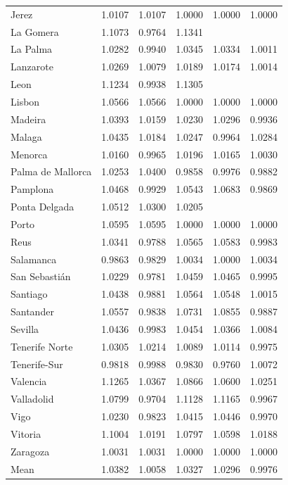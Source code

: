 \begin{table}[h!]
{\begin{tabular}{lccccc}
Jerez & 1.0107 & 1.0107 & 1.0000 & 1.0000 & 1.0000 \\
La Gomera &1.1073& 0.9764& 1.1341 &  &  \\ 
La Palma & 1.0282 & 0.9940 & 1.0345 & 1.0334 & 1.0011 \\
Lanzarote & 1.0269 & 1.0079 & 1.0189 & 1.0174 & 1.0014 \\
Leon & 1.1234 & 0.9938 & 1.1305 &  &  \\
Lisbon & 1.0566 & 1.0566 & 1.0000 & 1.0000 & 1.0000 \\
Madeira & 1.0393 & 1.0159 & 1.0230 & 1.0296 & 0.9936 \\
Malaga & 1.0435 & 1.0184 & 1.0247 & 0.9964 & 1.0284 \\
Menorca & 1.0160 & 0.9965 & 1.0196 & 1.0165 & 1.0030 \\
Palma de Mallorca & 1.0253 & 1.0400 & 0.9858 & 0.9976 & 0.9882 \\
Pamplona & 1.0468 & 0.9929 & 1.0543 & 1.0683 & 0.9869 \\
Ponta Delgada & 1.0512& 1.0300 & 1.0205 &  &  \\
Porto & 1.0595 & 1.0595 & 1.0000 & 1.0000 & 1.0000 \\
Reus & 1.0341 & 0.9788 & 1.0565 & 1.0583 & 0.9983 \\
Salamanca & 0.9863 & 0.9829 & 1.0034 & 1.0000 & 1.0034 \\
San Sebastián & 1.0229 & 0.9781 & 1.0459 & 1.0465 & 0.9995 \\
Santiago & 1.0438 & 0.9881 & 1.0564 & 1.0548 & 1.0015 \\
Santander & 1.0557 & 0.9838 & 1.0731 & 1.0855 & 0.9887 \\
Sevilla & 1.0436 & 0.9983 & 1.0454 & 1.0366 & 1.0084 \\
Tenerife Norte & 1.0305 & 1.0214 & 1.0089 & 1.0114 & 0.9975 \\
Tenerife-Sur & 0.9818 & 0.9988 & 0.9830 & 0.9760 & 1.0072 \\
Valencia & 1.1265& 1.0367 & 1.0866 &1.0600 & 1.0251 \\
Valladolid & 1.0799 & 0.9704 & 1.1128 & 1.1165 & 0.9967 \\
Vigo & 1.0230 & 0.9823 & 1.0415 & 1.0446 & 0.9970 \\
Vitoria & 1.1004 & 1.0191 & 1.0797 & 1.0598 & 1.0188 \\
Zaragoza & 1.0031 & 1.0031 & 1.0000 & 1.0000 & 1.0000 \\
 \midrule
 Mean & 1.0382
 & 1.0058  
 & 1.0327
 &1.0296
 & 0.9976
 \\
 \midrule
\end{tabular}%
}
\end{table}
\vspace{-0.2cm}



